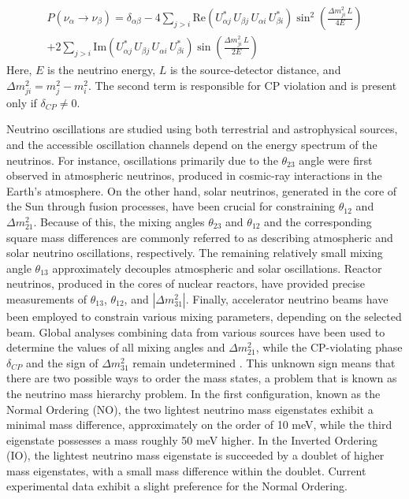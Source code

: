 \begin{eqnarray}
      P({\nu_\alpha \rightarrow\nu_\beta}) = \delta_{\alpha\beta} - 4\sum_{j > i}\mathrm{Re}\left(U_{\alpha j}^*\,U_{\beta j}\,
      U_{\alpha i}\,U_{\beta i}^*\right)\sin^2\left(\frac{\Delta m^2_{ji}\,L}{4E}\right) \\ 
      + 2\sum_{j > i}\mathrm{Im}
      \left(U_{\alpha j}^*\,U_{\beta j}\,U_{\alpha i}\,U_{\beta i}^*\right)\sin\left(\frac{\Delta m^2_{ji}\,L}{2E}
      \right) \nonumber
\end{eqnarray}
Here, $E$ is the neutrino energy, $L$ is the source-detector distance, and $\Delta m^2_{ji} = m_j^2 - m_i^2$. The
second term is responsible for CP violation and is present only if $\delta_{CP}\neq 0$.

Neutrino oscillations are studied using both terrestrial and astrophysical sources, and the accessible
oscillation channels depend on the energy spectrum of the neutrinos. For instance, oscillations primarily due to the
$\theta_{23}$ angle were first observed in atmospheric neutrinos, produced in
cosmic-ray interactions in the Earth's atmosphere. On the other hand, solar neutrinos, generated in the core of the Sun through fusion processes, have been crucial for
constraining $\theta_{12}$ and $\Delta m^2_{21}$. 
Because of this, the mixing angles $\theta_{23}$ and $\theta_{12}$ and the corresponding square mass differences are
commonly referred to as describing atmospheric and solar neutrino oscillations, respectively. The remaining relatively small mixing angle $\theta_{13}$ approximately decouples atmospheric and solar oscillations. 
Reactor neutrinos, produced in the cores of nuclear reactors, have provided precise measurements of $\theta_{13}$,
$\theta_{12}$, and $|\Delta m^2_{31}|$. Finally, accelerator neutrino beams have been employed to constrain various mixing
parameters, depending on the selected beam. Global analyses combining data from various sources have
been used to determine the values of all mixing angles and $\Delta m^2_{21}$, while the CP-violating phase $\delta_{CP}
$ and the sign of $\Delta m^2_{31}$ remain undetermined \cite{esteban2020fate}.
This unknown sign means that there are two possible ways to order the mass states, a problem that is known as the
neutrino mass hierarchy problem. 
In the first configuration, known as the Normal Ordering (NO), the two lightest neutrino mass
eigenstates exhibit a minimal mass difference, approximately on the order of 10 meV, while the third eigenstate
possesses a mass roughly 50 meV higher. In the Inverted Ordering (IO), the lightest neutrino mass eigenstate is
succeeded by a doublet of higher mass eigenstates, with a small mass difference within the doublet. Current experimental
data exhibit a slight preference for the Normal Ordering.


